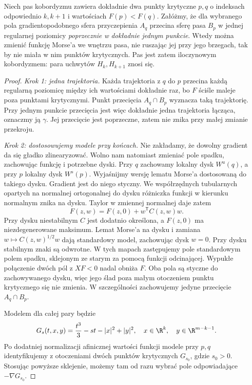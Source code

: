 \begin{twierdzenie}
\label{thm:zniesienie-18}
Niech pas kobordyzmu zawiera dokładnie
dwa punkty krytyczne $p,q$ o indeksach
odpowiednio $k,k+1$ i wartościach
$F(p)<F(q)$. Załóżmy, że dla wybranego
pola gradientopodobnego sfera przyczepienia
$A_q$ przecina sferę pasa $B_p$ w jednej
regularnej poziomicy \emph{poprzecznie
w dokładnie jednym punkcie}.
Wtedy można zmienić funkcję Morse'a
we wnętrzu pasa, nie ruszając jej przy
jego brzegach, tak by nie miała w nim
punktów krytycznych. Pas jest zatem
iloczynowym kobordyzmem: para uchwytów
$H_k,H_{k+1}$ znosi się.
\end{twierdzenie}
\begin{proof}
\emph{Krok 1: jedna trajektoria.}
Każda trajektoria z $q$ do $p$ przecina
każdą regularną poziomicę między ich
wartościami dokładnie raz, bo $F$
ściśle maleje poza punktami krytycznymi.
Punkt przecięcia $A_q\cap B_p$ wyznacza
taką trajektorię. Przy jednym punkcie
przecięcia jest więc dokładnie jedna
trajektoria łącząca, oznaczmy ją $\gamma$.
Jej przecięcie jest poprzeczne, zatem
nie znika przy małej zmianie przekroju.

\emph{Krok 2: dostosowujemy modele przy końcach.}
Nie zakładamy, że dowolny gradient da się gładko
zlinearyzować. Wolno nam natomiast zmieniać pole
spadku, zachowując funkcję i potrzebne dyski.
Przy $q$ zachowamy lokalny dysk $W^u(q)$,
a przy $p$ lokalny dysk $W^s(p)$.
Wyjaśnijmy wersję lematu Morse'a dostosowaną do takiego dysku.
Gradient jest do niego styczny. We współrzędnych
tubularnych opartych na normalnej ortogonalnej do dysku
różniczka funkcji w kierunku normalnym znika na dysku.
Taylor w zmiennej normalnej daje zatem
\[
 F(z,w)=F(z,0)+w^{\mathsf T}C(z,w)w.
\]
Przy dysku niestabilnym $C$ jest dodatnio określona,
a $F(z,0)$ ma niezdegenerowane maksimum.
Lemat Morse'a na dysku i zamiana $w\mapsto C(z,w)^{1/2}w$
dają standardowy model, zachowując dysk $w=0$.
Przy dysku stabilnym znaki są odwrotne.
W tych mapach zastępujemy pole standardowym polem
spadku, sklejonym ze starym za pomocą funkcji odcinającej.
Wypukłe połączenie dwóch pól z $XF<0$ nadal obniża $F$.
Oba pola są styczne do zachowywanego dysku, więc jego
ślad poza małym otoczeniem punktu krytycznego się nie zmienia.
W szczególności zachowujemy jedyne przecięcie $A_q\cap B_p$.

Modelem dla całej pary będzie
\begin{equation}\label{eq:narodziny-uchwytow-18}
 G_s(t,x,y)=\frac{t^3}{3}-st-|x|^2+|y|^2,
 \quad x\in\R^k,\quad y\in\R^{m-k-1}.
\end{equation}
Po dodatniej normalizacji afinicznej wartości funkcji
modele przy $p,q$ identyfikujemy z otoczeniami dwóch
punktów krytycznych $G_{s_0}$, gdzie $s_0>0$.
Stosując powyższe sklejenie, możemy tam od razu
wybrać pole odpowiadające $-\nabla G_{s_0}$.


\end{proof}
